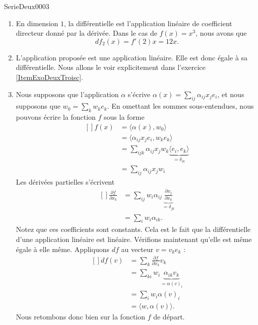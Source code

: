 
\begin{corrige}{SerieDeux0003}

	\begin{enumerate}

		\item
			En dimension $1$, la différentielle est l'application linéaire de coefficient directeur donné par la dérivée. Dans le cas de $f(x)=x^3$, nous avons que 
			\begin{equation}
				df_2(x)=f'(2)x=12x.
			\end{equation}
		\item
			L'application proposée est une application linéaire. Elle est donc égale à sa différentielle. Nous allons le voir explicitement dans l'exercice \ref{ItemExoDeuxTroisc}.
		\item\label{ItemExoDeuxTroisc}
			Nous supposons que l'application $\alpha$ s'écrive $\alpha(x)=\sum_{ij}\alpha_{ij}x_j e_i$, et nous supposons que $w_0=\sum_kw_ke_k$. En omettant les sommes sous-entendues, nous pouvons écrire la fonction $f$ sous la forme
			\begin{equation}
				\begin{aligned}[]
					f(x)&=\langle \alpha(x),w_0\rangle\\
					&=\langle \alpha_{ij}x_j e_i,w_ke_k\rangle\\
					&=\sum_{ijk}\alpha_{ij}x_jw_k\underbrace{\langle e_i,e_k\rangle}_{=\delta_{ik}}\\
					&=\sum_{ij}\alpha_{ij}x_jw_i
				\end{aligned}
			\end{equation}
			Les dérivées partielles s'écrivent
			\begin{equation}
				\begin{aligned}[]
					\frac{ \partial f }{ \partial x_k }&=\sum_{ij}w_i\alpha_{ij}\underbrace{\frac{ \partial x_j }{ \partial x_k }}_{=\delta_{jk}}\\
					&=\sum_iw_i\alpha_{ik}.
				\end{aligned}
			\end{equation}
			Notez que ces coefficients sont constants. Cela est le fait que la différentielle d'une application linéaire est linéaire. Vérifions maintenant qu'elle est même égale à elle même. Appliquons $df$ au vecteur $v=v_ke_k$ :
			\begin{equation}
				\begin{aligned}[]
					df(v)&=\sum_k\frac{ \partial f }{ \partial x_k }v_k\\
					&=\sum_{ki}w_i\underbrace{\alpha_{ik}v_k}_{=\alpha(v)_i}\\
					&=\sum_i w_i\alpha(v)_i\\
					&=\langle w,\alpha(v)\rangle.
				\end{aligned}
			\end{equation}
			Nous retombons donc bien sur la fonction $f$ de départ.


\end{enumerate}
\end{corrige}
